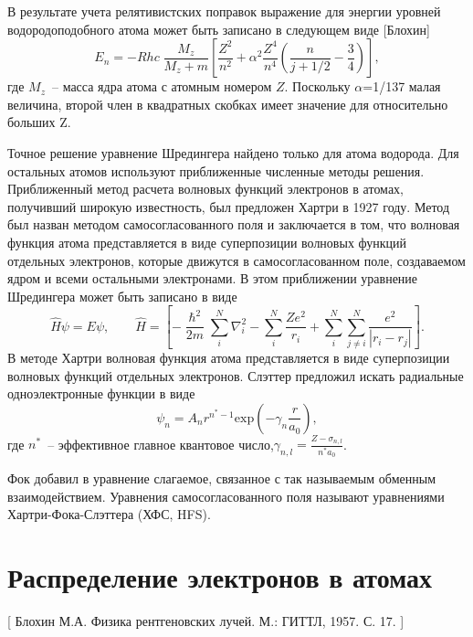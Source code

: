 \documentclass[a4paper,14pt, openany, twoside, draft]{extbook} %
\begin{document}
В результате учета релятивистских поправок выражение для энергии уровней водородоподобного атома может быть записано в следующем виде [Блохин]
\begin{equation}
\label{eq:2.24}
E_n=-Rhc\;\frac{M_z}{M_z+m}\left[\frac{Z^2}{n^2}+\alpha^2\frac{Z^4}{n^4}\left(\frac{n}{j+1/2}-\frac{3}{4}\right)\right],
\end{equation}
где $M_z$~-- масса ядра атома с атомным номером $Z$.  Поскольку ${\alpha}$=1/137 малая величина, второй член в квадратных скобках имеет значение для относительно больших Z.

Точное решение уравнение Шредингера найдено только для атома водорода.  Для остальных атомов используют приближенные численные методы решения.  Приближенный метод расчета волновых функций электронов в атомах, получивший широкую известность, был предложен Хартри в 1927 году.  Метод был назван методом самосогласованного поля и заключается в том, что волновая функция атома представляется в виде суперпозиции волновых функций отдельных электронов, которые движутся в самосогласованном поле, создаваемом ядром и всеми остальными электронами.  В этом приближении уравнение Шредингера может быть записано в виде
\begin{equation}
\label{eq:energylevel}
\hat H\psi=\mathit{E\psi},\qquad\hat H=\left[-\frac{\hslash^2}{2m}\overset N{\underset i{\sum }}\nabla_i^2-\overset N{\underset i{\sum }}\frac{Ze^2}{r_i}+\overset N{\underset i{\sum}}\overset N{\underset{j\neq i}{\sum}}\frac{e^2}{|r_i-r_j|}\right].
\end{equation}
В методе Хартри волновая функция атома представляется в виде суперпозиции волновых функций отдельных электронов.  Слэттер предложил искать радиальные одноэлектронные функции в виде
\begin{equation}
\label{eq:energylevel}
\psi_n=A_nr^{n^\ast -1}\text{exp}(-\gamma_n\frac {r}{a_0}),
\end{equation}
где  $n^\ast$~-- эффективное главное квантовое число,\;$\gamma_{n,l}=\frac{Z-\sigma_{n,l}}{n^\ast a_0}$.

Фок добавил в уравнение слагаемое, связанное с так называемым обменным взаимодействием.  Уравнения самосогласованного поля называют уравнениями Хартри-Фока-Слэттера (ХФС, HFS).

\section{Распределение электронов в атомах}
\label{sec:electron-in-athoms}
[ Блохин М.А. Физика рентгеновских лучей. М.: ГИТТЛ, 1957. С. 17. ]
\end{document}
